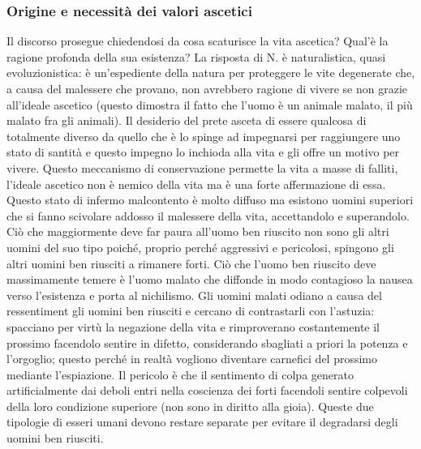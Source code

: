 \documentclass[10pt,a4paper]{article}
\begin{document}
\subsubsection{Origine e necessità dei valori ascetici}
Il discorso prosegue chiedendosi da cosa scaturisce la vita ascetica? Qual'è la ragione profonda della sua esistenza? La risposta di N. è naturalistica, quasi evoluzionistica: è un'espediente della natura per proteggere le vite degenerate che, a causa del malessere che provano, non avrebbero ragione di vivere se non grazie all'ideale ascetico (questo dimostra il fatto che l'uomo è un animale malato, il più malato fra gli animali). Il desiderio del prete asceta di essere qualcosa di totalmente diverso da quello che è lo spinge ad impegnarsi per raggiungere uno stato di santità e questo impegno lo inchioda alla vita e gli offre un motivo per vivere. Questo meccanismo di conservazione permette la vita a masse di falliti, l'ideale ascetico non è nemico della vita ma è una forte affermazione di essa. Questo stato di infermo malcontento è molto diffuso ma esistono uomini superiori che si fanno scivolare addosso il malessere della vita, accettandolo e superandolo. Ciò che maggiormente deve far paura all'uomo ben riuscito non sono gli altri uomini del suo tipo poiché, proprio perché aggressivi e pericolosi, spingono gli altri uomini ben riusciti a rimanere forti. Ciò che l'uomo ben riuscito deve massimamente temere è l'uomo malato che diffonde in modo contagioso la nausea verso l'esistenza e porta al nichilismo. Gli uomini malati odiano a causa del ressentiment gli uomini ben riusciti e cercano di contrastarli con l'astuzia: spacciano per virtù la negazione della vita e rimproverano costantemente il prossimo facendolo sentire in difetto, considerando sbagliati a priori la potenza e l'orgoglio; questo perché in realtà vogliono diventare carnefici del prossimo mediante l'espiazione. Il pericolo è che il sentimento di colpa generato artificialmente dai deboli entri nella coscienza dei forti facendoli sentire colpevoli della loro condizione superiore (non sono in diritto alla gioia). Queste due tipologie di esseri umani devono restare separate per evitare il degradarsi degli uomini ben riusciti.
\end{document}
